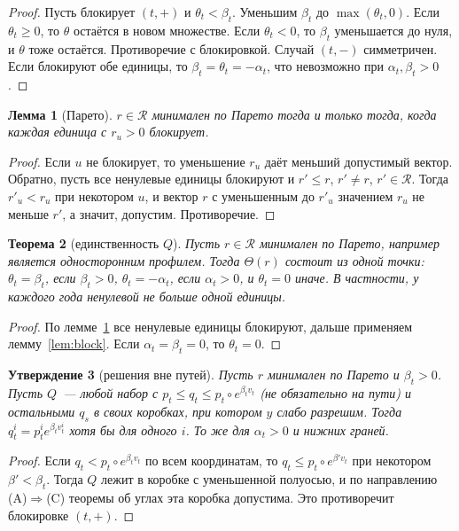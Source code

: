 \documentclass[a4paper,11pt]{article}
\theoremstyle{plain}
\newtheorem{theorem}{Теорема}[section]
\newtheorem{lemma}[theorem]{Лемма}
\newtheorem{proposition}[theorem]{Утверждение}
\theoremstyle{definition}
\theoremstyle{remark}
\begin{document}
\begin{proof}
    Пусть блокирует $(t,+)$ и $\theta_t<\beta_t$. Уменьшим $\beta_t$ до $\max(\theta_t,0)$. Если $\theta_t\ge0$, то $\theta$ остаётся в новом множестве. Если $\theta_t<0$, то $\beta_t$ уменьшается до нуля, и $\theta$ тоже остаётся. Противоречие с блокировкой. Случай $(t,-)$ симметричен. Если блокируют обе единицы, то $\beta_t=\theta_t=-\alpha_t$, что невозможно при $\alpha_t,\beta_t>0$.
\end{proof}

\begin{lemma}[Парето]\label{lem:pareto}
    $r\in\mathcal R$ минимален по Парето тогда и только тогда, когда каждая единица с $r_u>0$ блокирует.
\end{lemma}

\begin{proof}
    Если $u$ не блокирует, то уменьшение $r_u$ даёт меньший допустимый вектор. Обратно, пусть все ненулевые единицы блокируют и $r'\le r$, $r'\ne r$, $r'\in\mathcal R$. Тогда $r'_u<r_u$ при некотором $u$, и вектор $r$ с уменьшенным до $r'_u$ значением $r_u$ не меньше $r'$, а значит, допустим. Противоречие.
\end{proof}

\begin{theorem}[единственность $Q$]\label{thm:unique}
    Пусть $r\in\mathcal R$ минимален по Парето, например является односторонним профилем. Тогда $\Theta(r)$ состоит из одной точки: $\theta_t=\beta_t$, если $\beta_t>0$, $\theta_t=-\alpha_t$, если $\alpha_t>0$, и $\theta_t=0$ иначе. В частности, у каждого года ненулевой не больше одной единицы.
\end{theorem}

\begin{proof}
    По лемме~\ref{lem:pareto} все ненулевые единицы блокируют, дальше применяем лемму~\ref{lem:block}. Если $\alpha_t=\beta_t=0$, то $\theta_t=0$.
\end{proof}

\begin{proposition}[решения вне путей]\label{prop:offpath}
    Пусть $r$ минимален по Парето и $\beta_t>0$. Пусть $Q$~--- любой набор с $p_t\le q_t\le p_t\circ e^{\beta_tv_t}$ (не обязательно на пути) и остальными $q_s$ в своих коробках, при котором $y$ слабо разрешим. Тогда $q^i_t=p^i_te^{\beta_tv^i_t}$ хотя бы для одного $i$. То же для $\alpha_t>0$ и нижних граней.
\end{proposition}

\begin{proof}
    Если $q_t<p_t\circ e^{\beta_tv_t}$ по всем координатам, то $q_t\le p_t\circ e^{\beta'v_t}$ при некотором $\beta'<\beta_t$. Тогда $Q$ лежит в коробке с уменьшенной полуосью, и по направлению (A)$\Rightarrow$(C) теоремы об углах эта коробка допустима. Это противоречит блокировке $(t,+)$.
\end{proof}
\end{document}
